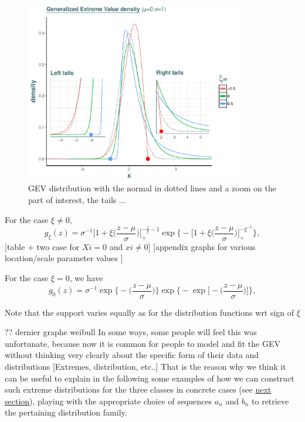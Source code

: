 \documentclass[11pt,a4paper,openany ]{book}
\begin{document}
\begin{figure}[!htb]
	\centering\includegraphics[width=0.85\textwidth, height = 0.7\linewidth]{gev3.pdf}\caption{GEV distribution with the normal in dotted lines and a zoom on the part of interest, the tails  ...}\label{gevdens}
\end{figure}


For the case $\xi\neq0$, 
\begin{equation}\label{densgev}
g_{\xi}(z)=\sigma^{-1}\bigg[1+\xi\bigg(\frac{z-\mu}{\sigma}\bigg)\bigg]_+^{-\frac{1}{\xi}-1}\exp\Bigg\{-\bigg[1+\xi\bigg(\frac{z-\mu}{\sigma}\bigg)\bigg]_+^{-\xi^{-1}}\Bigg\},
\end{equation}
[table + two case for $Xi=0$ and $xi\ne 0$]
[appendix graphs for various location/scale parameter values ]

For the case $\xi=0$, we have 
\begin{equation} \label{gevdensxi0}
g_0(z)= \sigma^{-1}\exp\bigg\{-\bigg(\frac{z-\mu}{\sigma}\bigg)\bigg\}\exp\Bigg\{-\exp\bigg[-\bigg(\frac{z-\mu}{\sigma}\bigg)\bigg]\Bigg\},
\end{equation}



Note that the support varies equally as for the distribution functions wrt sign of $\xi$




?? dernier graphe weibull
\newline
In some ways, some people will feel this was unfortunate, because now it is common for
people to model and fit the GEV without thinking very clearly about the
specific form of their data and distributions [Extremes, distribution, etc..] That is the 
reason why we think it can be useful to explain in the following some examples of how we 
can construct such extreme distributions for the three classes in concrete cases (see 
\hyperref[sec::appconcrete]{next section}), playing with the appropriate choice of 
sequences 
$a_n$ and $b_n$ to retrieve the pertaining distribution family.
\end{document}
